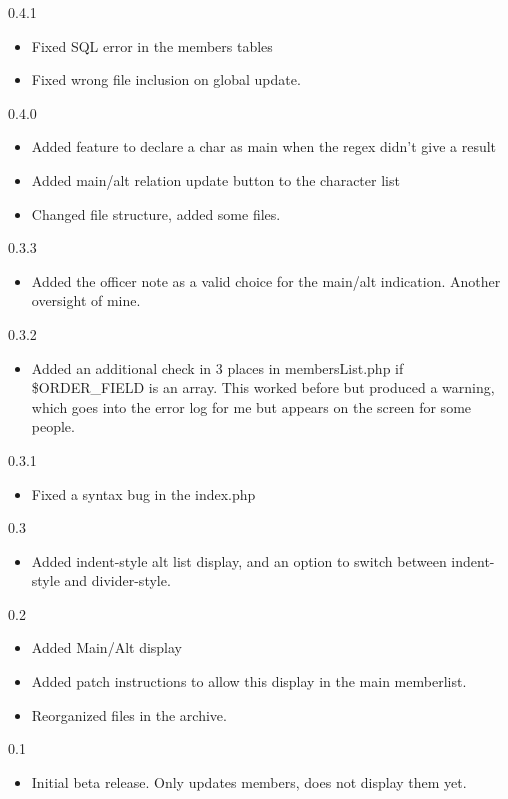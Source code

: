 \documentclass[12pt, a4paper]{article}
\begin{document}
\begin{description}
\item{0.4.1}
\begin{itemize}
\item Fixed SQL error in the members tables
\item Fixed wrong file inclusion on global update.
\end{itemize}

\item{0.4.0}
\begin{itemize}
\item Added feature to declare a char as main when the regex didn't give a result
\item Added main/alt relation update button to the character list
\item Changed file structure, added some files.
\end{itemize}

\item{0.3.3}
\begin{itemize}
\item Added the officer note as a valid choice for the main/alt indication.
   Another oversight of mine.
\end{itemize}

\item{0.3.2}
\begin{itemize}
\item Added an additional check in 3 places in membersList.php if \$ORDER\_FIELD
   is an array. This worked before but produced a warning, which goes into the
   error log for me but appears on the screen for some people.
\end{itemize}

\item{0.3.1}
\begin{itemize}
\item Fixed a syntax bug in the index.php
\end{itemize}

\item{0.3}
\begin{itemize}
\item Added indent-style alt list display, and an option to switch between
   indent-style and divider-style.
\end{itemize}

\item{0.2}
\begin{itemize}
\item Added Main/Alt display
\item Added patch instructions to allow this display in the main memberlist.
\item Reorganized files in the archive.
\end{itemize}

\item{0.1}
\begin{itemize}
\item Initial beta release. Only updates members, does not display them yet.
\end{itemize}
\end{description}
\end{document}
